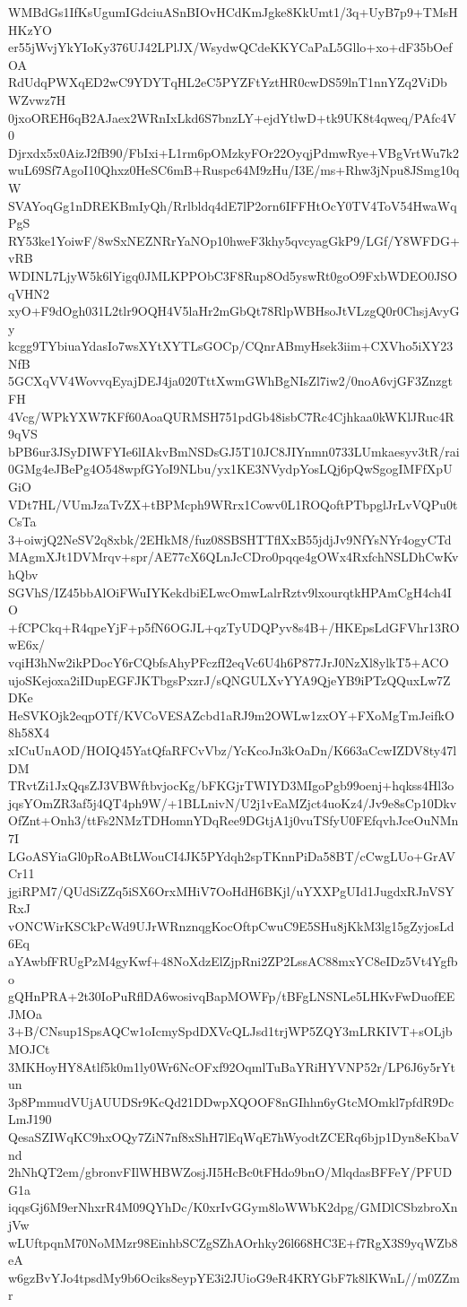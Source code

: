 WMBdGs1IfKsUgumIGdciuASnBIOvHCdKmJgke8KkUmt1/3q+UyB7p9+TMsHHKzYO
er55jWvjYkYIoKy376UJ42LPlJX/WsydwQCdeKKYCaPaL5Gllo+xo+dF35bOefOA
RdUdqPWXqED2wC9YDYTqHL2eC5PYZFtYztHR0cwDS59lnT1nnYZq2ViDbWZvwz7H
0jxoOREH6qB2AJaex2WRnIxLkd6S7bnzLY+ejdYtlwD+tk9UK8t4qweq/PAfc4V0
Djrxdx5x0AizJ2fB90/FbIxi+L1rm6pOMzkyFOr22OyqjPdmwRye+VBgVrtWu7k2
wuL69Sf7AgoI10Qhxz0HeSC6mB+Ruspc64M9zHu/I3E/ms+Rhw3jNpu8JSmg10qW
SVAYoqGg1nDREKBmIyQh/Rrlbldq4dE7lP2orn6IFFHtOcY0TV4ToV54HwaWqPgS
RY53ke1YoiwF/8wSxNEZNRrYaNOp10hweF3khy5qvcyagGkP9/LGf/Y8WFDG+vRB
WDINL7LjyW5k6lYigq0JMLKPPObC3F8Rup8Od5yswRt0goO9FxbWDEO0JSOqVHN2
xyO+F9dOgh031L2tlr9OQH4V5laHr2mGbQt78RlpWBHsoJtVLzgQ0r0ChsjAvyGy
kcgg9TYbiuaYdasIo7wsXYtXYTLsGOCp/CQnrABmyHsek3iim+CXVho5iXY23NfB
5GCXqVV4WovvqEyajDEJ4ja020TttXwmGWhBgNIsZl7iw2/0noA6vjGF3ZnzgtFH
4Vcg/WPkYXW7KFf60AoaQURMSH751pdGb48isbC7Rc4Cjhkaa0kWKlJRuc4R9qVS
bPB6ur3JSyDIWFYIe6lIAkvBmNSDsGJ5T10JC8JIYnmn0733LUmkaesyv3tR/rai
0GMg4eJBePg4O548wpfGYoI9NLbu/yx1KE3NVydpYosLQj6pQwSgogIMFfXpUGiO
VDt7HL/VUmJzaTvZX+tBPMcph9WRrx1Cowv0L1ROQoftPTbpglJrLvVQPu0tCsTa
3+oiwjQ2NeSV2q8xbk/2EHkM8/fuz08SBSHTTflXxB55jdjJv9NfYsNYr4ogyCTd
MAgmXJt1DVMrqv+spr/AE77cX6QLnJcCDro0pqqe4gOWx4RxfchNSLDhCwKvhQbv
SGVhS/IZ45bbAlOiFWuIYKekdbiELwcOmwLalrRztv9lxourqtkHPAmCgH4ch4IO
+fCPCkq+R4qpeYjF+p5fN6OGJL+qzTyUDQPyv8s4B+/HKEpsLdGFVhr13ROwE6x/
vqiH3hNw2ikPDocY6rCQbfsAhyPFczfI2eqVc6U4h6P877JrJ0NzXl8ylkT5+ACO
ujoSKejoxa2iIDupEGFJKTbgsPxzrJ/sQNGULXvYYA9QjeYB9iPTzQQuxLw7ZDKe
HeSVKOjk2eqpOTf/KVCoVESAZcbd1aRJ9m2OWLw1zxOY+FXoMgTmJeifkO8h58X4
xICuUnAOD/HOIQ45YatQfaRFCvVbz/YcKcoJn3kOaDn/K663aCcwIZDV8ty47lDM
TRvtZi1JxQqsZJ3VBWftbvjocKg/bFKGjrTWIYD3MIgoPgb99oenj+hqkss4Hl3o
jqsYOmZR3af5j4QT4ph9W/+1BLLnivN/U2j1vEaMZjct4uoKz4/Jv9e8sCp10Dkv
OfZnt+Onh3/ttFs2NMzTDHomnYDqRee9DGtjA1j0vuTSfyU0FEfqvhJceOuNMn7I
LGoASYiaGl0pRoABtLWouCI4JK5PYdqh2spTKnnPiDa58BT/cCwgLUo+GrAVCr11
jgiRPM7/QUdSiZZq5iSX6OrxMHiV7OoHdH6BKjl/uYXXPgUId1JugdxRJnVSYRxJ
vONCWirKSCkPcWd9UJrWRnznqgKocOftpCwuC9E5SHu8jKkM3lg15gZyjosLd6Eq
aYAwbfFRUgPzM4gyKwf+48NoXdzElZjpRni2ZP2LssAC88mxYC8eIDz5Vt4Ygfbo
gQHnPRA+2t30IoPuRflDA6wosivqBapMOWFp/tBFgLNSNLe5LHKvFwDuofEEJMOa
3+B/CNsup1SpsAQCw1oIcmySpdDXVcQLJsd1trjWP5ZQY3mLRKIVT+sOLjbMOJCt
3MKHoyHY8Atlf5k0m1ly0Wr6NcOFxf92OqmlTuBaYRiHYVNP52r/LP6J6y5rYtun
3p8PmmudVUjAUUDSr9KcQd21DDwpXQOOF8nGIhhn6yGtcMOmkl7pfdR9DcLmJ190
QesaSZIWqKC9hxOQy7ZiN7nf8xShH7lEqWqE7hWyodtZCERq6bjp1Dyn8eKbaVnd
2hNhQT2em/gbronvFIlWHBWZosjJI5HcBc0tFHdo9bnO/MlqdasBFFeY/PFUDG1a
iqqsGj6M9erNhxrR4M09QYhDc/K0xrIvGGym8loWWbK2dpg/GMDlCSbzbroXnjVw
wLUftpqnM70NoMMzr98EinhbSCZgSZhAOrhky26l668HC3E+f7RgX3S9yqWZb8eA
w6gzBvYJo4tpsdMy9b6Ociks8eypYE3i2JUioG9eR4KRYGbF7k8lKWnL//m0ZZmr
